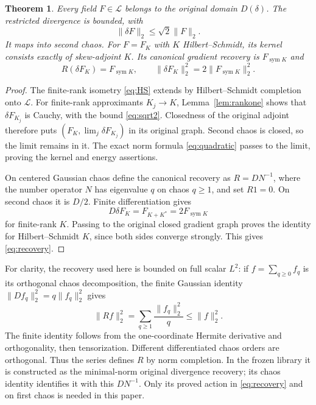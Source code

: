 \documentclass[11pt]{article}
\newtheorem{theorem}{Theorem}[section]
\begin{document}
\begin{theorem}\label{thm:complete}
Every field $F\in\mathcal L$ belongs to the original domain $D(\delta)$.
The restricted divergence is bounded, with
\begin{equation}\label{eq:sqrt2}
 \|\delta F\|_2\leq\sqrt2\|F\|_2.
\end{equation}
It maps into second chaos. For $F=F_K$ with $K$ Hilbert--Schmidt,
its kernel consists exactly of skew-adjoint $K$. Its canonical
gradient recovery is $F_{\operatorname{sym}K}$ and
\begin{equation}\label{eq:recovery}
 R(\delta F_K)=F_{\operatorname{sym}K},\qquad
 \|\delta F_K\|_2^2=2\|F_{\operatorname{sym}K}\|_2^2.
\end{equation}
\end{theorem}
\begin{proof}
The finite-rank isometry \eqref{eq:HS} extends by Hilbert--Schmidt
completion onto $\mathcal L$. For finite-rank approximants $K_j\to K$,
Lemma~\ref{lem:rankone} shows that $\delta F_{K_j}$ is Cauchy, with
the bound \eqref{eq:sqrt2}. Closedness of the original adjoint
therefore puts $(F_K,\lim_j\delta F_{K_j})$ in its original graph.
Second chaos is closed, so the limit remains in it. The exact norm
formula \eqref{eq:quadratic} passes to the limit, proving the kernel
and energy assertions.

On centered Gaussian chaos define the canonical recovery as
$R=DN^{-1}$, where the number operator $N$ has eigenvalue $q$ on
chaos $q\geq1$, and set $R1=0$. On second chaos it is $D/2$.
Finite differentiation gives
\[
 D\delta F_K=F_{K+K^*}=2F_{\operatorname{sym}K}
\]
for finite-rank $K$. Passing to the original closed gradient graph
proves the identity for Hilbert--Schmidt $K$, since both sides
converge strongly. This gives \eqref{eq:recovery}.
\end{proof}

For clarity, the recovery used here is bounded on full scalar $L^2$:
if $f=\sum_{q\geq0}f_q$ is its orthogonal chaos decomposition, the
finite Gaussian identity
$\|Df_q\|_2^2=q\|f_q\|_2^2$ gives
\[
 \|Rf\|_2^2=\sum_{q\geq1}\frac{\|f_q\|_2^2}{q}
 \leq\|f\|_2^2.
\]
The finite identity follows from the one-coordinate Hermite derivative
and orthogonality, then tensorization. Different differentiated chaos
orders are orthogonal. Thus the series defines $R$ by norm completion.
In the frozen library it is constructed as the minimal-norm original
divergence recovery; its chaos identity identifies it with this $DN^{-1}$.
Only its proved action in \eqref{eq:recovery} and on first chaos is
needed in this paper.
\end{document}
